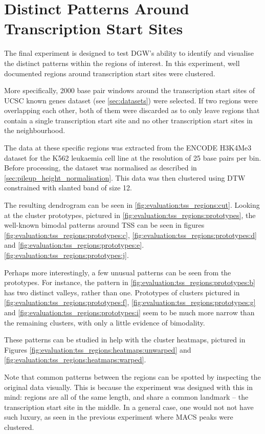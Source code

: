 \documentclass[parskip]{cs4rep}
\newcommand{\histonemodification}[1]{#1}
\begin{document}
\section{Distinct Patterns Around Transcription Start Sites}
\label{sec:evaluation:tss}

The final experiment is designed to test DGW's ability to identify and visualise the distinct patterns within the regions of interest. In this experiment, well documented regions around transcription start sites were clustered.

More specifically, 2000 base pair windows around the transcription start sites of UCSC known genes dataset (see \autoref{sec:datasets}) were selected. If two regions were overlapping each other, both of them were discarded as to only leave regions that contain a single transcription start site and no other transcription start sites in the neighbourhood.

The data at these specific regions was extracted from the ENCODE \histonemodification{H3K4Me3} dataset for the K562 leukaemia cell line at the resolution of 25 base pairs per bin. Before processing, the dataset was normalised as described in \autoref{sec:pileup_height_normalisation}.
This data was then clustered using DTW constrained with slanted band of size 12.

The resulting dendrogram can be seen in \autoref{fig:evaluation:tss_regions:cut}. Looking at the cluster prototypes, pictured in \autoref{fig:evaluation:tss_regions:prototypes}, the well-known bimodal patterns around TSS can be seen in figures \ref{fig:evaluation:tss_regions:prototypes:c}, \ref{fig:evaluation:tss_regions:prototypes:d} and \ref{fig:evaluation:tss_regions:prototypes:e}.
\ref{fig:evaluation:tss_regions:prototypes:j}.

Perhaps more interestingly, a few unusual patterns can be seen from the prototypes.
For instance, the pattern in \ref{fig:evaluation:tss_regions:prototypes:b} has two distinct valleys,
rather than one.
Prototypes of clusters pictured in \ref{fig:evaluation:tss_regions:prototypes:f}, \ref{fig:evaluation:tss_regions:prototypes:g} and  \ref{fig:evaluation:tss_regions:prototypes:i} seem to be much more narrow than the remaining clusters, with only a little evidence of bimodality. 

These patterns can be studied in help with the cluster heatmaps, pictured in 
Figures \ref{fig:evaluation:tss_regions:heatmaps:unwarped} and \ref{fig:evaluation:tss_regions:heatmaps:warped}.

Note that common patterns between the regions can be spotted by inspecting the original data visually. 
This is because the experiment was designed with this in mind: regions are all of the same length, and share a common landmark -- the transcription start site in the middle. In a general case, one would not not have such luxury, as seen in the previous experiment where MACS peaks were clustered.
\end{document}

